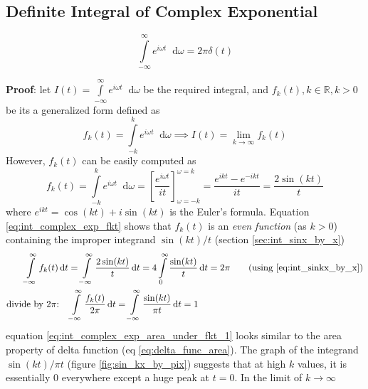 \documentclass[11pt, a4paper]{article}
\newcommand{\eqrefnp}[1]{\textup{\ref{#1}}}
\newcommand{\diff}{\mathop{}\!\mathrm{d}}
\newcommand{\dt}{\diff t}
\newcommand{\domega}{\diff \omega}
\newcommand{\dint}[2]{\int \limits_{#1}^{#2}}  %
\newcommand{\intinfty}{\dint{-\infty}{\infty}}	%
\newcommand{\intzerotoinfty}{\dint{0}{\infty}}	%
\begin{document}
\subsection{Definite Integral of Complex Exponential}\label{sec:int_complex_exp}
\begin{equation}\label{eq:int_complex_exp}
\intinfty e^{i\omega t} \domega = 2\pi \delta (t)
\end{equation}

\vspace{4pt}
\textbf{Proof}: \cite{herman2016fourieranalysis} let $I(t) = \intinfty e^{i\omega t} \domega$ be the required integral, and $f_{k}(t), k\in \mathbb{R}, k > 0$ be its a generalized form defined as
\begin{equation}\label{eq:int_complex_exp_It_as_fkt}
	f_{k}(t) = \dint{-k}{k} e^{i\omega t} \domega \implies I(t) = \lim\limits_{k \to \infty} f_{k}(t)
\end{equation}
However, $f_{k}(t)$ can be easily computed as
\begin{equation}\label{eq:int_complex_exp_fkt}
	f_{k}(t) = \dint{-k}{k} e^{i\omega t} \domega = \left[\frac{e^{i\omega t}}{it}\right]_{\omega=-k}^{\omega=k} = \frac{e^{ikt} - e^{-ikt}}{it} = \frac{2\sin(kt)}{t}
\end{equation}
where $e^{ikt}=\cos(kt) + i\sin(kt)$ is the Euler's formula. Equation \eqref{eq:int_complex_exp_fkt} shows that $f_{k}(t)$ is an \textit{even function} (as $k > 0$) containing the improper integrand $\sin(kt)/t$ (section \ref{sec:int_sinx_by_x})
\begin{align}
	\intinfty f_{k}(t) \dt & = \intinfty \frac{2\sin(kt)}{t} \dt = 4 \intzerotoinfty \frac{\sin(kt)}{t} \dt = 2\pi	\tag{using \eqrefnp{eq:int_sinkx_by_x}} \nonumber \\
	\text{divide by $2\pi$:} \quad & \intinfty \frac{f_{k}(t)}{2\pi} \dt = \intinfty \frac{\sin(kt)}{\pi t} \dt = 1 \label{eq:int_complex_exp_area_under_fkt_1}
\end{align}
equation \eqref{eq:int_complex_exp_area_under_fkt_1} looks similar to the area property of delta function (eq \eqrefnp{eq:delta_func_area}). The graph of the integrand $\sin(kt)/\pi t$ (figure \ref{fig:sin_kx_by_pix}) suggests that at high $k$ values, it is essentially $0$ everywhere except a huge peak at $t=0$. In the limit of $k \to \infty$
\end{document}
